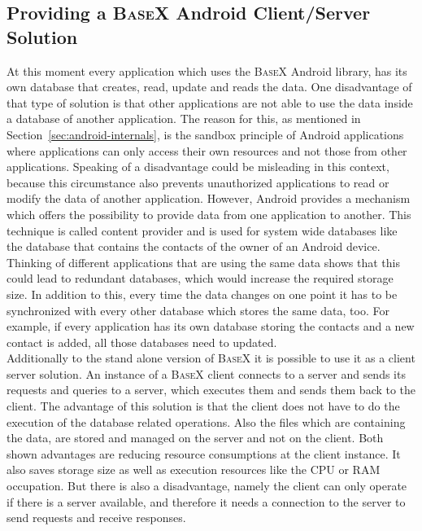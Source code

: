 \subsection{Providing a \textsc{BaseX} Android Client/Server Solution}
\label{sec:migration:providing-a-server-client-solution}
At this moment every application which uses the \textsc{BaseX} Android library, has its own database that creates, read, update and reads the data.
One disadvantage of that type of solution is that other applications are not able to use the data inside a database of another application.
The reason for this, as mentioned in Section~\ref{sec:android-internals}, is the sandbox principle of Android applications where applications can only access their own resources and not those from other applications.
Speaking of a disadvantage could be misleading in this context, because this circumstance also prevents unauthorized applications to read or modify the data of another application.
However, Android provides a mechanism which offers the possibility to provide data from one application to another.
This technique is called content provider and is used for system wide databases like the database that contains the contacts of the owner of an Android device.
Thinking of different applications that are using the same data shows that this could lead to redundant databases, which would increase the required storage size.
In addition to this, every time the data changes on one point it has to be synchronized with every other database which stores the same data, too.
For example, if every application has its own database storing the contacts and a new contact is added, all those databases need to updated.\\
Additionally to the stand alone version of \textsc{BaseX} it is possible to use it as a client server solution.
An instance of a \textsc{BaseX} client connects to a server and sends its requests and queries to a server, which executes them and sends them back to the client.
The advantage of this solution is that the client does not have to do the execution of the database related operations.
Also the files which are containing the data, are stored and managed on the server and not on the client.
Both shown advantages are reducing resource consumptions at the client instance.
It also saves storage size as well as execution resources like the CPU or RAM occupation.
But there is also a disadvantage, namely the client can only operate if there is a server available, and therefore it needs a connection to the server to send requests and receive responses.\\
